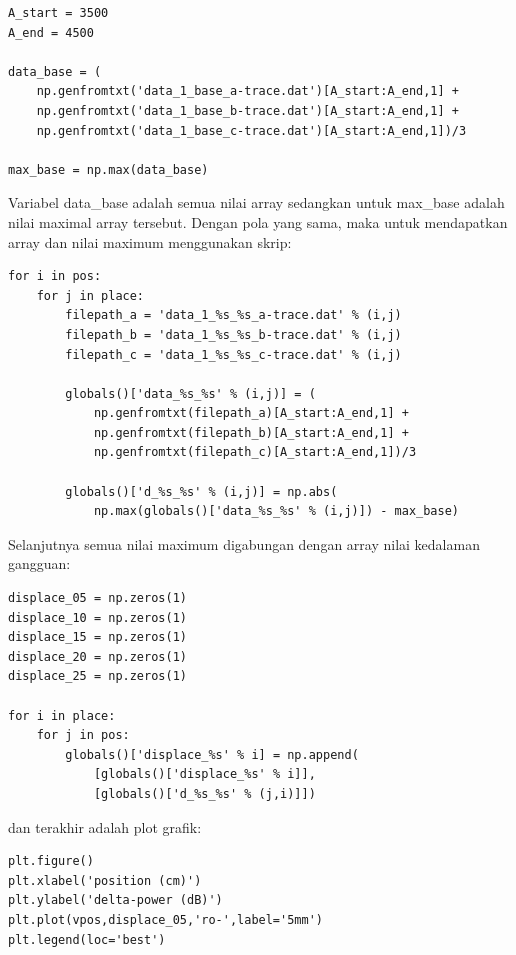 \documentclass[12pt]{article}
\begin{document}
	\begin{verbatim}
A_start = 3500
A_end = 4500

data_base = (
	np.genfromtxt('data_1_base_a-trace.dat')[A_start:A_end,1] +
	np.genfromtxt('data_1_base_b-trace.dat')[A_start:A_end,1] +
	np.genfromtxt('data_1_base_c-trace.dat')[A_start:A_end,1])/3

max_base = np.max(data_base)
	\end{verbatim}
	
	Variabel data\_base adalah semua nilai array sedangkan untuk max\_base adalah nilai	maximal array tersebut.
	Dengan pola yang sama, maka untuk mendapatkan array dan nilai maximum menggunakan skrip:
	
	\begin{verbatim}
for i in pos:
	for j in place:
		filepath_a = 'data_1_%s_%s_a-trace.dat' % (i,j)
		filepath_b = 'data_1_%s_%s_b-trace.dat' % (i,j)
		filepath_c = 'data_1_%s_%s_c-trace.dat' % (i,j)
		
		globals()['data_%s_%s' % (i,j)] = (
			np.genfromtxt(filepath_a)[A_start:A_end,1] +
			np.genfromtxt(filepath_b)[A_start:A_end,1] +
			np.genfromtxt(filepath_c)[A_start:A_end,1])/3
		
		globals()['d_%s_%s' % (i,j)] = np.abs(
			np.max(globals()['data_%s_%s' % (i,j)]) - max_base)
	\end{verbatim}
	
	Selanjutnya semua nilai maximum digabungan dengan array nilai kedalaman gangguan:
	
	\begin{verbatim}
displace_05 = np.zeros(1)
displace_10 = np.zeros(1)
displace_15 = np.zeros(1)
displace_20 = np.zeros(1)
displace_25 = np.zeros(1)
	
for i in place:            
	for j in pos:
		globals()['displace_%s' % i] = np.append(
			[globals()['displace_%s' % i]],
			[globals()['d_%s_%s' % (j,i)]])
	\end{verbatim}
	
	dan terakhir adalah plot grafik:
	
	\begin{verbatim}
plt.figure()
plt.xlabel('position (cm)')
plt.ylabel('delta-power (dB)')
plt.plot(vpos,displace_05,'ro-',label='5mm')
plt.legend(loc='best')
	\end{verbatim}

\end{document}
